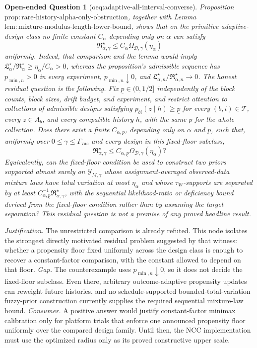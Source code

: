 \documentclass{article}
\newtheorem{openendedquestion}{Open-ended Question}
\begin{document}
\begin{openendedquestion}[oeq:adaptive-all-interval-converse]\label{oeq:adaptive-all-interval-converse}
Proposition \(\mathrm{prop:rare\text{-}history\text{-}alpha\text{-}only\text{-}obstruction}\), together with Lemma \(\mathrm{lem:mixture\text{-}modulus\text{-}length\text{-}lower\text{-}bound}\), shows that on the primitive adaptive-design class no finite constant \(C_\alpha\) depending only on \(\alpha\) can satisfy \[\mathfrak R_{\alpha,\gamma}^\star\le C_\alpha\Omega_{\mathcal D,\gamma}(\eta_\alpha)\] uniformly. Indeed, that comparison and the lemma would imply \(\mathfrak L_\alpha^\star/\mathfrak R_\alpha^\star\ge\eta_\alpha/C_\alpha>0\), whereas the proposition's admissible sequence has \(p_{\min,n}>0\) in every experiment, \(p_{\min,n}\downarrow0\), and \(\mathfrak L_{\alpha,n}^\star/\mathfrak R_{\alpha,n}^\star\to0\). The honest residual question is the following. Fix \(\underline p\in(0,1/2]\) independently of the block counts, block sizes, drift budget, and experiment, and restrict attention to collections of admissible designs satisfying \(p_{bi}(z\mid h)\ge\underline p\) for every \((b,i)\in\mathcal T\), every \(z\in A_b\), and every compatible history \(h\), with the same \(\underline p\) for the whole collection. Does there exist a finite \(C_{\alpha,\underline p}\), depending only on \(\alpha\) and \(\underline p\), such that, uniformly over \(0\le\gamma\le\Gamma_{\mathrm{vac}}\) and every design in this fixed-floor subclass, \[\mathfrak R_{\alpha,\gamma}^\star\le C_{\alpha,\underline p}\Omega_{\mathcal D,\gamma}(\eta_\alpha)?\] Equivalently, can the fixed-floor condition be used to construct two priors supported almost surely on \(\mathcal Y_{M,\gamma}\) whose assignment-averaged observed-data mixture laws have total variation at most \(\eta_\alpha\) and whose \(\tau_W\)-supports are separated by at least \(C_{\alpha,\underline p}^{-1}\mathfrak R_{\alpha,\gamma}^\star\), with the sequential likelihood-ratio or deficiency bound derived from the fixed-floor condition rather than by assuming the target separation? This residual question is not a premise of any proved headline result.
\end{openendedquestion}
\par\smallskip\noindent \textit{Justification.} The unrestricted comparison is already refuted. This node isolates the strongest directly motivated residual problem suggested by that witness: whether a propensity floor fixed uniformly across the design class is enough to recover a constant-factor comparison, with the constant allowed to depend on that floor. \textit{Gap.} The counterexample uses \(p_{\min,n}\downarrow0\), so it does not decide the fixed-floor subclass. Even there, arbitrary outcome-adaptive propensity updates can reweight future histories, and no schedule-supported bounded-total-variation fuzzy-prior construction currently supplies the required sequential mixture-law bound. \textit{Consumer.} A positive answer would justify constant-factor minimax calibration only for platform trials that enforce one announced propensity floor uniformly over the compared design family. Until then, the NCC implementation must use the optimized radius only as its proved constructive upper scale.
\end{document}
